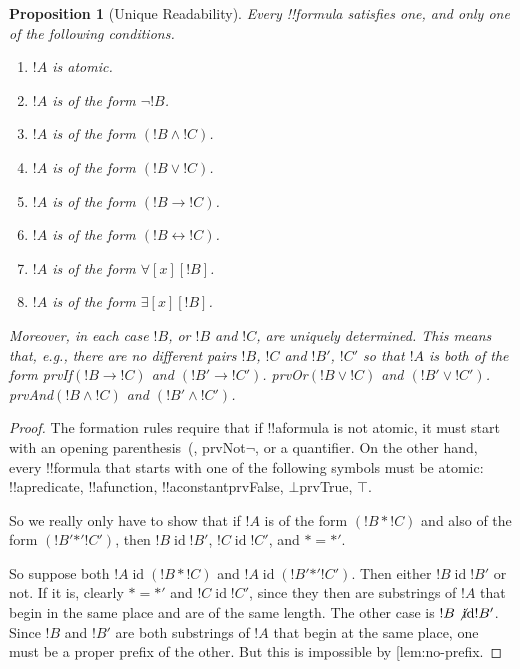 \documentclass[10pt,a4paper]{article}
\makeatletter
\theoremstyle{plain}
\newtheorem{prop}[thm]{Proposition}
\theoremstyle{definition}
\theoremstyle{remark}
\newcommand{\olref}{\@ifnextchar[{\olref@i}{\olref@final}}
\def\olref@i[#1]{\@ifnextchar[{\olref@ii}{\olref@final}}
\def\olref@ii[#1]{\@ifnextchar[{\olref@iii}{\olref@final}}
\def\olref@iii[#1]{\olref@final}
\def\olref@final#1{\ref{#1}}
\providecommand{\lif}{\mathbin{\rightarrow}}
\providecommand{\lforall}{\mathord{\forall}}
\providecommand{\lexists}{\mathord{\exists}}
\providecommand{\ltrue}{\top}
\providecommand{\lfalse}{\bot}
\providecommand{\iftag}[1]{#1}
\providecommand{\tagitem}[1]{\item[#1]}
\providecommand{\liff}{\mathbin{\leftrightarrow}}
\providecommand{\ident}{\operatorname{id}}
\providecommand{\iftag}{}
\makeatother
\begin{document}
\begin{prop}[Unique Readability]
Every !!{formula} satisfies one, and only one of the following conditions.
\begin{enumerate}
\item $!A$ is atomic.

\tagitem{prvNot}{$!A$ is of the form $\lnot !B$.}{}

\tagitem{prvAnd}{$!A$ is of the form $(!B \land !C)$.}{}

\tagitem{prvOr}{$!A$ is of the form $(!B \lor !C)$.}{}

\tagitem{prvIf}{$!A$ is of the form $(!B \lif !C)$.}{}

\tagitem{prvIff}{$!A$ is of the form $(!B \liff !C)$.}{}

\tagitem{prvAll}{$!A$ is of the form $\lforall[x][!B]$.}{}

\tagitem{prvEx}{$!A$ is of the form $\lexists[x][!B]$.}{}
\end{enumerate}
Moreover, in each case $!B$, or $!B$ and $!C$, are uniquely
determined.  This means that, e.g., there are no different pairs $!B$,
$!C$ and $!B'$, $!C'$ so that $!A$ is both of the form 
\iftag{prvIf}{$(!B \lif !C)$ and $(!B' \lif !C')$.}{
    \iftag{prvOr}{$(!B \lor !C)$ and $(!B' \lor !C')$.}{
      \iftag{prvAnd}{$(!B \land !C)$ and $(!B' \land !C')$.}{}}}
\end{prop}

\begin{proof}
The formation rules require that if !!a{formula} is not atomic, it
must start with an opening parenthesis~(, \iftag{prvNot}{$\lnot$,}{}
or a quantifier. On the other hand, every !!{formula} that starts with
one of the following symbols must be atomic: !!a{predicate}, !!a{function}, !!a{constant}\iftag{prvFalse}{, $\lfalse$}{}\iftag{prvTrue}{, $\ltrue$}{}.

So we really only have to show that if $!A$ is of the form $(!B \ast
!C)$ and also of the form $(!B' \mathbin{\ast'} !C')$, then $!B \ident
!B'$, $!C \ident !C'$, and $\ast = {\ast'}$.

So suppose both $!A \ident (!B \ast !C)$ and $!A \ident (!B'
\mathbin{\ast'} !C')$.  Then either $!B \ident !B'$ or not.  If it is,
clearly $\ast = {\ast'}$ and $!C \ident !C'$, since they then are
substrings of $!A$ that begin in the same place and are of the same
length.  The other case is $!B \not\ident !B'$.  Since $!B$ and
$!B'$ are both substrings of $!A$ that begin at the same place, one
must be a proper prefix of the other.  But this is impossible by
\olref{lem:no-prefix}.
\end{proof}
\end{document}
